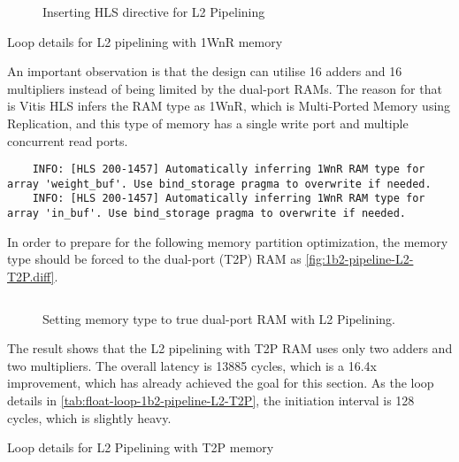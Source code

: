\begin{figure}[ht!]
    \centering
    \inputminted[firstline=3]{diff}{program/1b2-pipeline-L2-1WnR.diff}
    \caption{Inserting HLS directive for L2 Pipelining}\label{fig:1b2-pipeline-L2-1WnR.diff}
\end{figure}

\begin{table}[ht!]
    \caption{Loop details for L2 pipelining with 1WnR memory}
    \label{tab:float-loop-1b2-pipeline-L2-1WnR}
    \centering
    
\end{table}


An important observation is that the design can utilise 16 adders and 16 multipliers instead of being limited by the dual-port RAMs.
The reason for that is Vitis HLS infers the RAM type as 1WnR, which is Multi-Ported Memory using Replication, and this type of memory has a single write port and multiple concurrent read ports.
\begin{verbatim}
    INFO: [HLS 200-1457] Automatically inferring 1WnR RAM type for array 'weight_buf'. Use bind_storage pragma to overwrite if needed.
    INFO: [HLS 200-1457] Automatically inferring 1WnR RAM type for array 'in_buf'. Use bind_storage pragma to overwrite if needed.
\end{verbatim}


In order to prepare for the following memory partition optimization, the memory type should be forced to the dual-port (T2P) RAM as \autoref{fig:1b2-pipeline-L2-T2P.diff}.
\begin{figure}[ht!]
    \centering
    \inputminted[firstline=3]{diff}{program/1b2-pipeline-L2-T2P.diff}
    \caption{Setting memory type to true dual-port RAM with L2 Pipelining.}\label{fig:1b2-pipeline-L2-T2P.diff}
\end{figure}
The result shows that the L2 pipelining with T2P RAM uses only two adders and two multipliers.
The overall latency is 13885 cycles, which is a 16.4x improvement, which has already achieved the goal for this section.
As the loop details in \autoref{tab:float-loop-1b2-pipeline-L2-T2P}, the initiation interval is 128 cycles, which is slightly heavy.

\begin{table}
    \caption{Loop details for L2 Pipelining with T2P memory}
    \label{tab:float-loop-1b2-pipeline-L2-T2P}
    \centering
    
\end{table}


